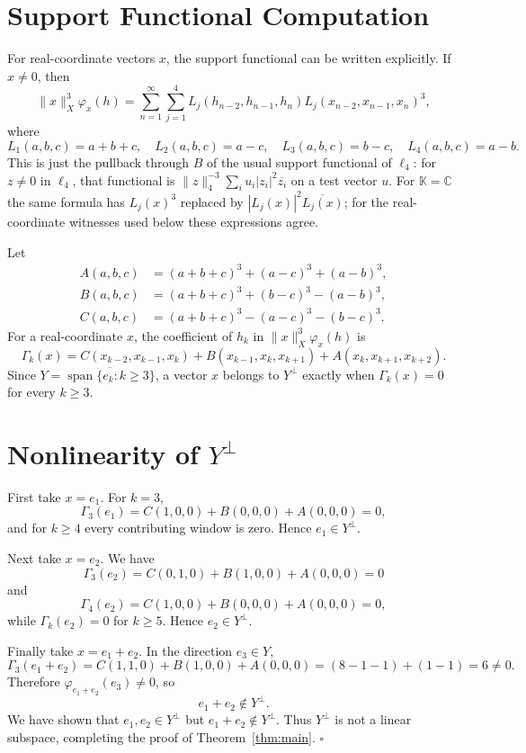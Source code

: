 \documentclass[11pt]{article}
\newcommand{\K}{\mathbb K}
\newcommand{\C}{\mathbb C}
\begin{document}
\section*{Support Functional Computation}

For real-coordinate vectors \(x\), the support functional can be written
explicitly.  If \(x\ne 0\), then
\[
   \|x\|_X^3\varphi_x(h)
      = \sum_{n=1}^\infty
        \sum_{j=1}^4 L_j(h_{n-2},h_{n-1},h_n)
                    L_j(x_{n-2},x_{n-1},x_n)^3,
\]
where
\[
L_1(a,b,c)=a+b+c,\quad
L_2(a,b,c)=a-c,\quad
L_3(a,b,c)=b-c,\quad
L_4(a,b,c)=a-b.
\]
This is just the pullback through \(B\) of the usual support functional of
\(\ell_4\): for \(z\ne0\) in \(\ell_4\), that functional is
\(\|z\|_4^{-3}\sum_i u_i |z_i|^2\overline{z_i}\) on a test vector \(u\).
For \(\K=\C\) the same formula has \(L_j(x)^3\) replaced by
\(|L_j(x)|^2\overline{L_j(x)}\); for the real-coordinate witnesses used
below these expressions agree.

Let
\[
\begin{aligned}
 A(a,b,c)&=(a+b+c)^3+(a-c)^3+(a-b)^3,\\
 B(a,b,c)&=(a+b+c)^3+(b-c)^3-(a-b)^3,\\
 C(a,b,c)&=(a+b+c)^3-(a-c)^3-(b-c)^3.
\end{aligned}
\]
For a real-coordinate \(x\), the coefficient of \(h_k\) in
\(\|x\|_X^3\varphi_x(h)\) is
\[
\Gamma_k(x)
  = C(x_{k-2},x_{k-1},x_k)
    +B(x_{k-1},x_k,x_{k+1})
    +A(x_k,x_{k+1},x_{k+2}).
\]
Since \(Y=\overline{\operatorname{span}\{e_k:k\ge 3\}}\), a vector \(x\)
belongs to \(Y^\perp\) exactly when \(\Gamma_k(x)=0\) for every \(k\ge 3\).

\section*{Nonlinearity of \(Y^\perp\)}

First take \(x=e_1\).  For \(k=3\),
\[
  \Gamma_3(e_1)=C(1,0,0)+B(0,0,0)+A(0,0,0)=0,
\]
and for \(k\ge 4\) every contributing window is zero.  Hence \(e_1\in Y^\perp\).

Next take \(x=e_2\).  We have
\[
  \Gamma_3(e_2)=C(0,1,0)+B(1,0,0)+A(0,0,0)=0
\]
and
\[
  \Gamma_4(e_2)=C(1,0,0)+B(0,0,0)+A(0,0,0)=0,
\]
while \(\Gamma_k(e_2)=0\) for \(k\ge 5\).  Hence \(e_2\in Y^\perp\).

Finally take \(x=e_1+e_2\).  In the direction \(e_3\in Y\),
\[
  \Gamma_3(e_1+e_2)
     = C(1,1,0)+B(1,0,0)+A(0,0,0)
     = (8-1-1)+(1-1)
     =6\ne 0.
\]
Therefore \(\varphi_{e_1+e_2}(e_3)\ne 0\), so
\[
   e_1+e_2\notin Y^\perp .
\]
We have shown that \(e_1,e_2\in Y^\perp\) but \(e_1+e_2\notin Y^\perp\).
Thus \(Y^\perp\) is not a linear subspace, completing the proof of
Theorem~\ref{thm:main}. \(\square\)
\end{document}
